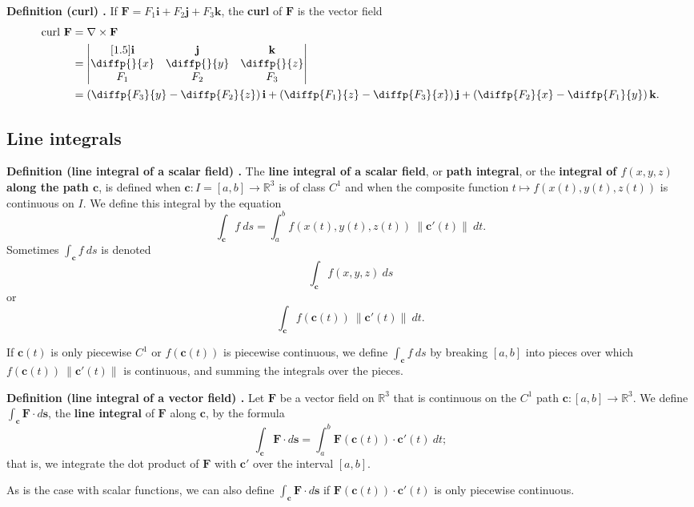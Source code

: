 \begin{shaded}
\textbf{Definition (curl) \cite{math2111_notes}.} If $\mathbf{F} = F_1 \mathbf{i} + F_2 \mathbf{j} + F_3 \mathbf{k}$, the \textbf{curl} of $\mathbf{F}$ is the vector field
\begin{align*}
\text{curl} \ \mathbf{F} &= \nabla \times \mathbf{F} \\
&= \begin{vmatrix}[1.5]
	\mathbf{i} & \mathbf{j} & \mathbf{k} \\
	\diffp{}{x} & \diffp{}{y} & \diffp{}{z} \\
	F_1 & F_2 & F_3
\end{vmatrix} \\
&= \left( \diffp{F_3}{y} - \diffp{F_2}{z} \right) \mathbf{i} + \left( \diffp{F_1}{z} - \diffp{F_3}{x} \right) \mathbf{j} + \left( \diffp{F_2}{x} - \diffp{F_1}{y} \right) \mathbf{k} .
\end{align*}
\end{shaded}

\subsection{Line integrals}

\begin{shaded}
\textbf{Definition (line integral of a scalar field) \cite{marsden_vector_calculus}.} The \textbf{line integral of a scalar field}, or \textbf{path integral}, or the \textbf{integral of $f(x, y, z)$ along the path $\mathbf{c}$}, is defined when $\mathbf{c}: I = [a, b] \to \mathbb{R}^3$ is of class $C^1$ and when the composite function $t \mapsto f(x(t), y(t), z(t))$ is continuous on $I$. We define this integral by the equation
$$ \int_{\mathbf{c}} f \ ds = \int_a^b f(x(t), y(t), z(t)) \ \lVert \mathbf{c}'(t) \rVert \ dt . $$
Sometimes $\int_\mathbf{c} f \ ds$ is denoted
$$ \int_\mathbf{c} f(x, y, z) \ ds $$
or
$$ \int_\mathbf{c} f(\mathbf{c}(t)) \ \lVert \mathbf{c}'(t) \rVert \ dt . $$

If $\mathbf{c}(t)$ is only piecewise $C^1$ or $f(\mathbf{c}(t))$ is piecewise continuous, we define $\int_\mathbf{c} f \ ds$ by breaking $[a, b]$ into pieces over which $f(\mathbf{c}(t)) \ \lVert \mathbf{c}'(t) \rVert$ is continuous, and summing the integrals over the pieces.
\end{shaded}

\begin{shaded}
\textbf{Definition (line integral of a vector field) \cite{marsden_vector_calculus}.} Let $\mathbf{F}$ be a vector field on $\mathbb{R}^3$ that is continuous on the $C^1$ path $\mathbf{c} : [a, b] \to \mathbb{R}^3$. We define $\int_\mathbf{c} \mathbf{F} \cdot d\mathbf{s}$, the \textbf{line integral} of $\mathbf{F}$ along $\mathbf{c}$, by the formula
$$ \int_\mathbf{c} \mathbf{F} \cdot d\mathbf{s} = \int_a^b \mathbf{F}(\mathbf{c}(t)) \cdot \mathbf{c}'(t) \ dt ; $$
that is, we integrate the dot product of $\mathbf{F}$ with $\mathbf{c}'$ over the interval $[a, b]$.

As is the case with scalar functions, we can also define $\int_\mathbf{c} \mathbf{F} \cdot d\mathbf{s}$ if $\mathbf{F}(\mathbf{c}(t)) \cdot \mathbf{c}'(t)$ is only piecewise continuous.
\end{shaded}

